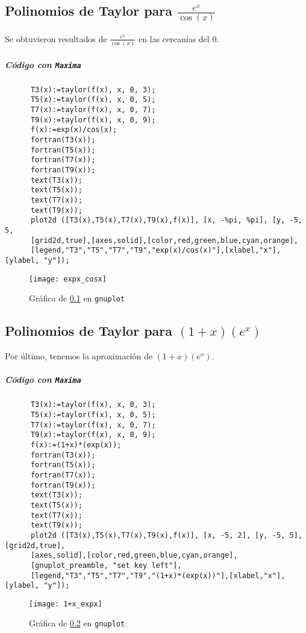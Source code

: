\documentclass[a4paper]{article}
\begin{document}
  \subsection{Polinomios de Taylor para $\frac{e ^{x}}{\cos(x)}$}
  \label{4}
  	Se obtuvieron resultados de $\frac{e^{x}}{\cos(x)}$ en las cercanías del $0$.
    
    \subparagraph{Código con \texttt{Maxima}}
      \begin{verbatim}
      T3(x):=taylor(f(x), x, 0, 3);
      T5(x):=taylor(f(x), x, 0, 5);
      T7(x):=taylor(f(x), x, 0, 7);
      T9(x):=taylor(f(x), x, 0, 9);
      f(x):=exp(x)/cos(x);
      fortran(T3(x));
      fortran(T5(x));
      fortran(T7(x));
      fortran(T9(x));
      text(T3(x));
      text(T5(x));
      text(T7(x));
      text(T9(x));
      plot2d ([T3(x),T5(x),T7(x),T9(x),f(x)], [x, -%pi, %pi], [y, -5, 5,
      [grid2d,true],[axes,solid],[color,red,green,blue,cyan,orange], 
      [legend,"T3","T5","T7","T9","exp(x)/cos(x)"],[xlabel,"x"],[ylabel, "y"]);
      \end{verbatim}
 
      \begin{figure}[H]
        \centering
        \texttt{[image: expx\_cosx]}
        \caption{Gráfica de \ref{4} en \texttt{gnuplot}}
      \end{figure}

  \subsection{Polinomios de Taylor para $(1+x)(e^x)$}
  \label{5}
  	Por último, tenemos la aproximación de $(1+x)(e^x)$.
    
    \subparagraph{Código con \texttt{Maxima}}
      \begin{verbatim}
      T3(x):=taylor(f(x), x, 0, 3);
      T5(x):=taylor(f(x), x, 0, 5);
      T7(x):=taylor(f(x), x, 0, 7);
      T9(x):=taylor(f(x), x, 0, 9);
      f(x):=(1+x)*(exp(x));
      fortran(T3(x));
      fortran(T5(x));
      fortran(T7(x));
      fortran(T9(x));
      text(T3(x));
      text(T5(x));
      text(T7(x));
      text(T9(x));
      plot2d ([T3(x),T5(x),T7(x),T9(x),f(x)], [x, -5, 2], [y, -5, 5],[grid2d,true],
      [axes,solid],[color,red,green,blue,cyan,orange], 
      [gnuplot_preamble, "set key left"], 
      [legend,"T3","T5","T7","T9","(1+x)*(exp(x))"],[xlabel,"x"],[ylabel, "y"]);
            \end{verbatim}
    
      \begin{figure}[H]
        \centering
        \texttt{[image: 1+x\_expx]}
        \caption{Gráfica de \ref{5} en \texttt{gnuplot}}
      \end{figure}
      
\end{document}
